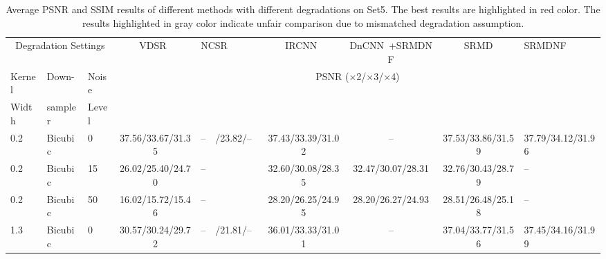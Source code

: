 \documentclass[10pt,twocolumn,letterpaper]{article}
\begin{document}
\begin{table}[!htbp]\scriptsize
\caption{Average PSNR and SSIM results of different methods with different degradations on Set5. The best results are highlighted in \textcolor[rgb]{1.00,0.00,0.00}{red} color. The results highlighted in \textcolor[rgb]{0.45,0.45,0.45}{gray} color indicate unfair comparison due to mismatched degradation assumption.} \vspace{-0.1cm}%
\center
\begin{tabular}{|p{0.84cm}<{\centering}|p{0.8cm}<{\centering}|p{0.8cm}<{\centering}|c|p{1.4cm}<{\centering}| c|c|c|p{1.8cm}<{\centering}|}
  \hline
 \multicolumn{3}{|c|}{Degradation Settings} &  VDSR~\cite{kim2015accurate} & NCSR~\cite{dong2013nonlocally}  & IRCNN~\cite{zhang2017learning}  & DnCNN~\cite{zhang2017beyond}+SRMDNF & SRMD  & SRMDNF\\\cline{1-9}
   Kernel  & Down- & Noise  &  \multicolumn{6}{c|}{\multirow{2}{*}{PSNR ($\times$2/$\times$3/$\times$4)}}   \\
    Width & sampler & Level  & \multicolumn{6}{c|}{}    \\ \hline\hline
  0.2 & Bicubic&  0 & 37.56/33.67/31.35 & --~~/\textcolor[rgb]{0.45,0.45,0.45}{23.82}/--~~  &  37.43/33.39/31.02  & -- & 37.53/33.86/31.59  & \textcolor[rgb]{1.00,0.00,0.00}{37.79}/\textcolor[rgb]{1.00,0.00,0.00}{34.12}/\textcolor[rgb]{1.00,0.00,0.00}{31.96}  \\
  0.2 & Bicubic & 15  &\textcolor[rgb]{0.45,0.45,0.45}{26.02}/\textcolor[rgb]{0.45,0.45,0.45}{25.40}/\textcolor[rgb]{0.45,0.45,0.45}{24.70} & --  & 32.60/30.08/28.35 & 32.47/30.07/28.31 & \textcolor[rgb]{1.00,0.00,0.00}{32.76}/\textcolor[rgb]{1.00,0.00,0.00}{30.43}/\textcolor[rgb]{1.00,0.00,0.00}{28.79} & --\\
  0.2 & Bicubic & 50  &\textcolor[rgb]{0.45,0.45,0.45}{16.02}/\textcolor[rgb]{0.45,0.45,0.45}{15.72}/\textcolor[rgb]{0.45,0.45,0.45}{15.46} & --  & 28.20/26.25/24.95 & 28.20/26.27/24.93 & \textcolor[rgb]{1.00,0.00,0.00}{28.51}/\textcolor[rgb]{1.00,0.00,0.00}{26.48}/\textcolor[rgb]{1.00,0.00,0.00}{25.18} & --\\
\cline{1-9}
   1.3 & Bicubic & 0 &\textcolor[rgb]{0.45,0.45,0.45}{30.57}/\textcolor[rgb]{0.45,0.45,0.45}{30.24}/\textcolor[rgb]{0.45,0.45,0.45}{29.72} & --~~/\textcolor[rgb]{0.45,0.45,0.45}{21.81}/--~~  & 36.01/33.33/31.01  &  -- & 37.04/33.77/31.56  &  \textcolor[rgb]{1.00,0.00,0.00}{37.45}/\textcolor[rgb]{1.00,0.00,0.00}{34.16}/\textcolor[rgb]{1.00,0.00,0.00}{31.99}\\

\end{tabular}
\end{table}
\end{document}
